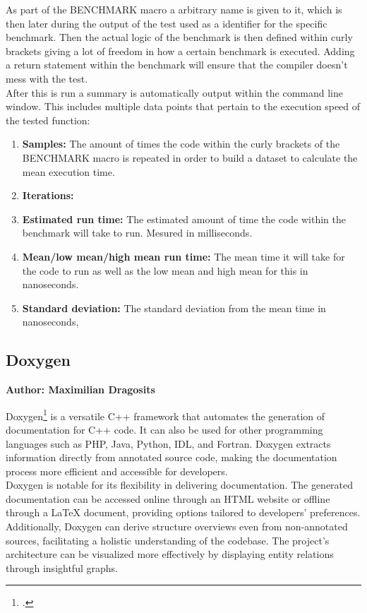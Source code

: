 As part of the BENCHMARK macro a arbitrary name is given to it, which is then later during the output of the test used as a identifier for the specific benchmark.
Then the actual logic of the benchmark is then defined within curly brackets giving a lot of freedom in how a certain benchmark is executed. Adding a return statement
within the benchmark will ensure that the compiler doesn't mess with the test.\\
\vspace{\baselineskip}
After this is run a summary is automatically output within the command line window. This includes multiple data points that pertain to the execution speed of the tested
function:
\begin{enumerate}
    \item \textbf{Samples:} The amount of times the code within the curly brackets of the BENCHMARK macro is repeated in order to build a dataset to calculate the mean execution time.
    \item \textbf{Iterations:} %
    \item \textbf{Estimated run time:} The estimated amount of time the code within the benchmark will take to run. Mesured in milliseconds.
    \item \textbf{Mean/low mean/high mean run time:} The mean time it will take for the code to run as well as the low mean and high mean for this in nanoseconds.
    \item \textbf{Standard deviation:} The standard deviation from the mean time in nanoseconds,
\end{enumerate}

\subsection{Doxygen}
\textbf{Author: Maximilian Dragosits}

Doxygen\footcite{doxygen_main_site} is a versatile C++ framework that automates the generation of documentation for C++ code. It can also be used for other programming languages such as 
PHP, Java, Python, IDL, and Fortran. Doxygen extracts information directly from annotated source code, making the documentation process more efficient and 
accessible for developers.\\

Doxygen is notable for its flexibility in delivering documentation. The generated documentation can be accessed online through an HTML website or offline 
through a LaTeX document, providing options tailored to developers' preferences. Additionally, Doxygen can derive structure overviews even from non-annotated 
sources, facilitating a holistic understanding of the codebase. The project's architecture can be visualized more effectively by displaying entity relations 
through insightful graphs.\\

